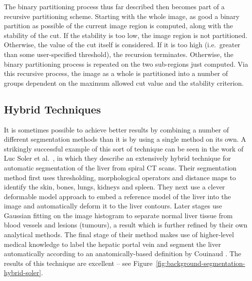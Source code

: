 The binary partitioning process thus far described then becomes part of a recursive partitioning scheme. Starting with the whole image, as good a binary partition as possible of the current image region is computed, along with the stability of the cut. If the stability is too low, the image region is not partitioned. Otherwise, the value of the cut itself is considered. If it is too high (i.e.~greater than some user-specified threshold), the recursion terminates. Otherwise, the binary partitioning process is repeated on the two sub-regions just computed. Via this recursive process, the image as a whole is partitioned into a number of groups dependent on the maximum allowed cut value and the stability criterion.

\subsection{Hybrid Techniques}

It is sometimes possible to achieve better results by combining a number of different segmentation methods than it is by using a single method on its own. A strikingly successful example of this sort of technique can be seen in the work of Luc Soler et al.\ \cite{soler01}, in which they describe an extensively hybrid technique for automatic segmentation of the liver from spiral CT scans. Their segmentation method first uses thresholding, morphological operators and distance maps to identify the skin, bones, lungs, kidneys and spleen. They next use a clever deformable model approach to embed a reference model of the liver into the image and automatically deform it to the liver contours. Later stages use Gaussian fitting on the image histogram to separate normal liver tissue from blood vessels and lesions (tumours), a result which is further refined by their own analytical methods. The final stage of their method makes use of higher-level medical knowledge to label the hepatic portal vein and segment the liver automatically according to an anatomically-based definition by Couinaud \cite{couinaud57}. The results of this technique are excellent -- see Figure~\ref{fig:background-segmentation-hybrid-soler}.


